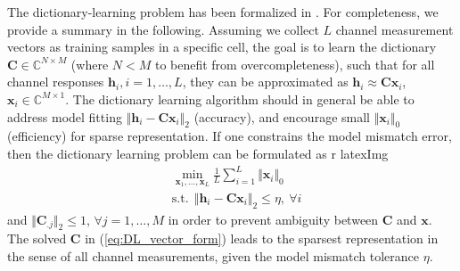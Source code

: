 The dictionary-learning problem has been formalized in \cite{CE_FDD:journals/corr/DingR16}. For completeness, we provide a summary in the following. %
Assuming we collect $L$ channel measurement vectors as training samples in a specific cell, the goal is to learn the dictionary $\mathbf{C} \in \mathbb{C}^{N\times M}$ (where $N<M$ to benefit from overcompleteness), 
such that for all channel responses $\mathbf{h}_i, i=1,\ldots,L$, they can be approximated as $\mathbf{h}_i\approx \mathbf{C}\mathbf{x}_i$, $\mathbf{x}_i\in \mathbb{C}^{M\times 1}$. The dictionary learning algorithm should in general be able to address model fitting $\Vert \mathbf{h}_i-\mathbf{C}\mathbf{x}_i\Vert_2$
(accuracy), and encourage small $\Vert \mathbf{x}_i\Vert_0$ (efficiency) for sparse representation. If one constrains the 
model mismatch error, then the dictionary learning problem can be formulated as
r latexImg {
\begin{align}
&\min\limits_{\mathbf{x}_1,\ldots,\mathbf{x}_L} \frac{1}{L}\sum_{i=1}^L\Vert\mathbf{x}_i\Vert_0\\
&\mathrm{s.t.}\:\:\Vert\mathbf{h}_i-\mathbf{C}\mathbf{x}_i\Vert_2\leq \eta,\:\forall i
\label{eq:DL_vector_form}
\end{align}}
and $\Vert \mathbf{C}_{.j}\Vert_2\leq 1$, $\forall j=1,\ldots, M$ in order to prevent ambiguity between $\mathbf{C}$ and $\mathbf{x}$. The solved $\mathbf{C}$ in (\ref{eq:DL_vector_form}) leads to the sparsest representation in the sense of all channel measurements, given the model mismatch tolerance $\eta$.

